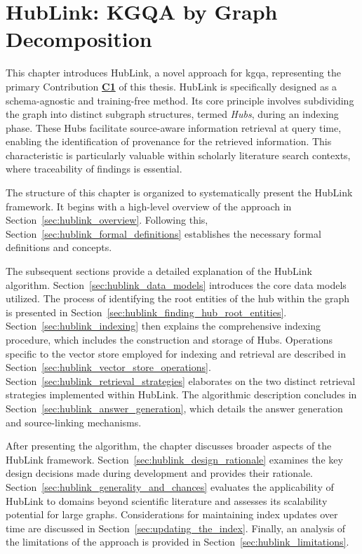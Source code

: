 \chapter{HubLink: KGQA by Graph Decomposition}
\label{ch:hublink}


This chapter introduces HubLink, a novel approach for \gls{kgqa}, representing the primary Contribution \hyperref[enum:c1]{\textbf{C1}} of this thesis. HubLink is specifically designed as a schema-agnostic and training-free method. Its core principle involves subdividing the graph into distinct subgraph structures, termed \emph{Hubs}, during an indexing phase. These Hubs facilitate source-aware information retrieval at query time, enabling the identification of provenance for the retrieved information. This characteristic is particularly valuable within scholarly literature search contexts, where traceability of findings is essential.

The structure of this chapter is organized to systematically present the HubLink framework. It begins with a high-level overview of the approach in Section~\ref{sec:hublink_overview}. Following this, Section~\ref{sec:hublink_formal_definitions} establishes the necessary formal definitions and concepts.

The subsequent sections provide a detailed explanation of the HubLink algorithm. Section~\ref{sec:hublink_data_models} introduces the core data models utilized. The process of identifying the root entities of the hub within the graph is presented in Section~\ref{sec:hublink_finding_hub_root_entities}. Section~\ref{sec:hublink_indexing} then explains the comprehensive indexing procedure, which includes the construction and storage of Hubs. Operations specific to the vector store employed for indexing and retrieval are described in Section~\ref{sec:hublink_vector_store_operations}. Section~\ref{sec:hublink_retrieval_strategies} elaborates on the two distinct retrieval strategies implemented within HubLink. The algorithmic description concludes in Section~\ref{sec:hublink_answer_generation}, which details the answer generation and source-linking mechanisms.

After presenting the algorithm, the chapter discusses broader aspects of the HubLink framework. Section~\ref{sec:hublink_design_rationale} examines the key design decisions made during development and provides their rationale. Section~\ref{sec:hublink_generality_and_chances} evaluates the applicability of HubLink to domains beyond scientific literature and assesses its scalability potential for large graphs. Considerations for maintaining index updates over time are discussed in Section~\ref{sec:updating_the_index}. Finally, an analysis of the limitations of the approach is provided in Section~\ref{sec:hublink_limitations}. 











